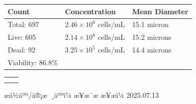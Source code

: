 \documentclass[UTF8,10pt,a4paper,fontset=fandol]{ctexart}
\newcommand{\fieldvalue}[1]{#1}
\newcommand{\handwritten}[1]{#1}
\begin{document}
\medskip
\noindent
\begin{tabularx}{\textwidth}{@{}X X X@{}}
\textbf{Count} & \textbf{Concentration} & \textbf{Mean Diameter} \\[2pt]
\hline
Total:
\fieldvalue{697}
&
\fieldvalue{$2.46\times 10^6$ cells/mL}
&
\fieldvalue{15.1 micron}
\\[3pt]

Live:
\fieldvalue{605}
&
\fieldvalue{$2.14\times 10^6$ cells/mL}
&
\fieldvalue{15.2 microns}
\\[3pt]

Dead:
\fieldvalue{92}
&
\fieldvalue{$3.25\times 10^5$ cells/mL}
&
\fieldvalue{14.4 microns}
\\[3pt]

Viability:
\fieldvalue{86.8\%}
&
&
\end{tabularx}

\medskip

\noindent
\begin{tabular}{cc}
\fbox{\rule{0pt}{4.0cm}\rule{0.43\textwidth}{0pt}}
&
\fbox{\rule{0pt}{4.0cm}\rule{0.43\textwidth}{0pt}}
\\[8pt]
\fbox{\rule{0pt}{4.0cm}\rule{0.43\textwidth}{0pt}}
&
\fbox{\rule{0pt}{4.0cm}\rule{0.43\textwidth}{0pt}}
\end{tabular}

\vfill

\noindent
æä½äºº/å®¡æ ¸äººï¼
\fieldvalue{\handwritten{æ¥æ¯æ}}
\hfill
æ¥æï¼
\fieldvalue{\handwritten{2025.07.13}}
\end{document}
